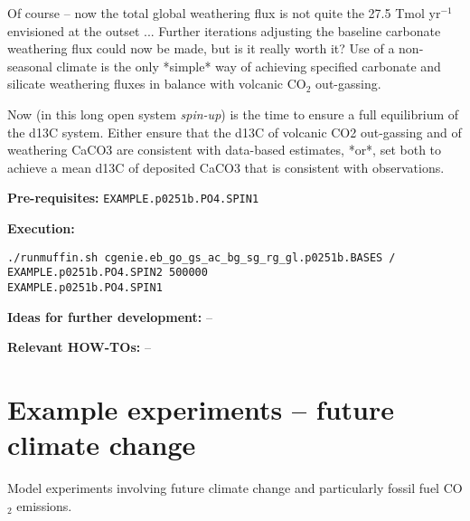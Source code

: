 \documentclass[10pt,twoside]{article}
\begin{document}
Of course -- now the total global weathering flux is not quite the 27.5 Tmol yr$^{-1}$ envisioned at the outset ... Further iterations adjusting the baseline carbonate weathering flux could now be made, but is it really worth it? Use of a non-seasonal climate is the only *simple* way of achieving specified carbonate and silicate weathering fluxes in balance with volcanic CO$_{2}$ out-gassing.

Now (in this long open system \textit{spin-up}) is the time to ensure a full equilibrium of the d13C system. Either ensure that the d13C of volcanic CO2 out-gassing and of weathering CaCO3 are consistent with data-based estimates, *or*, set both to achieve a mean d13C of deposited CaCO3 that is consistent with observations.

\noindent \textbf{Pre-requisites:} \texttt{EXAMPLE.p0251b.PO4.SPIN1}

\noindent \textbf{Execution:} 
\vspace{-10pt}\small\begin{verbatim}./runmuffin.sh cgenie.eb_go_gs_ac_bg_sg_rg_gl.p0251b.BASES / EXAMPLE.p0251b.PO4.SPIN2 500000 
EXAMPLE.p0251b.PO4.SPIN1\end{verbatim}\normalsize\vspace{-10pt}

\noindent \textbf{Ideas for further development:} --

\noindent \textbf{Relevant HOW-TOs:} --


\newpage
\section{Example experiments -- \textbf{future climate change}}\label{example_experiments_future}

Model experiments involving future climate change and particularly fossil fuel CO$_{2}$ emissions.

\end{document}

